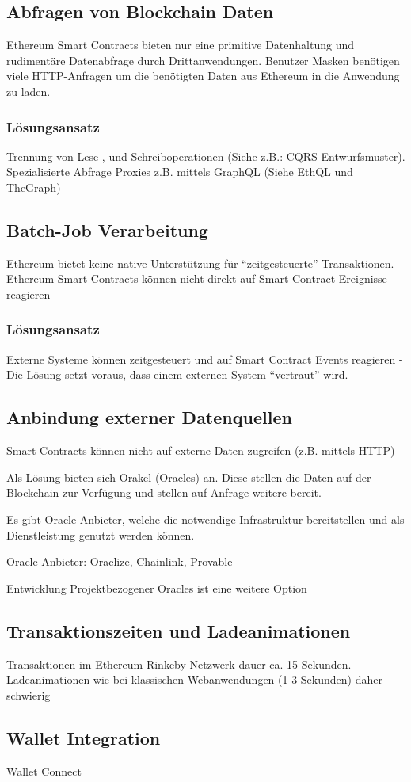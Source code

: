 \subsection*{Abfragen von Blockchain Daten}
Ethereum Smart Contracts bieten nur eine primitive Datenhaltung und rudimentäre Datenabfrage durch Drittanwendungen. 
Benutzer Masken benötigen viele HTTP-Anfragen um die benötigten Daten aus Ethereum in die Anwendung zu laden.

\subsubsection*{Lösungsansatz}
Trennung von Lese-, und Schreiboperationen (Siehe z.B.: CQRS Entwurfsmuster). Spezialisierte Abfrage Proxies z.B. mittels GraphQL (Siehe EthQL und TheGraph)


\subsection*{Batch-Job Verarbeitung}
Ethereum bietet keine native Unterstützung für “zeitgesteuerte” Transaktionen.
Ethereum Smart Contracts können nicht direkt auf Smart Contract Ereignisse reagieren

\subsubsection*{Lösungsansatz}
Externe Systeme können zeitgesteuert und auf Smart Contract Events reagieren - Die Lösung setzt voraus, dass einem externen System “vertraut” wird.


\subsection*{Anbindung externer Datenquellen}
Smart Contracts können nicht auf externe Daten zugreifen (z.B. mittels HTTP)

Als Lösung bieten sich Orakel (Oracles) an. Diese stellen die Daten auf der Blockchain zur Verfügung und stellen auf Anfrage weitere bereit.

Es gibt Oracle-Anbieter, welche die notwendige Infrastruktur bereitstellen und als Dienstleistung genutzt werden können.

Oracle Anbieter: Oraclize, Chainlink, Provable

Entwicklung Projektbezogener Oracles ist eine weitere Option


\subsection*{Transaktionszeiten und Ladeanimationen}
Transaktionen im Ethereum Rinkeby Netzwerk dauer ca. 15 Sekunden. 
Ladeanimationen wie bei klassischen Webanwendungen (1-3 Sekunden) daher schwierig


\subsection*{Wallet Integration}
Wallet Connect